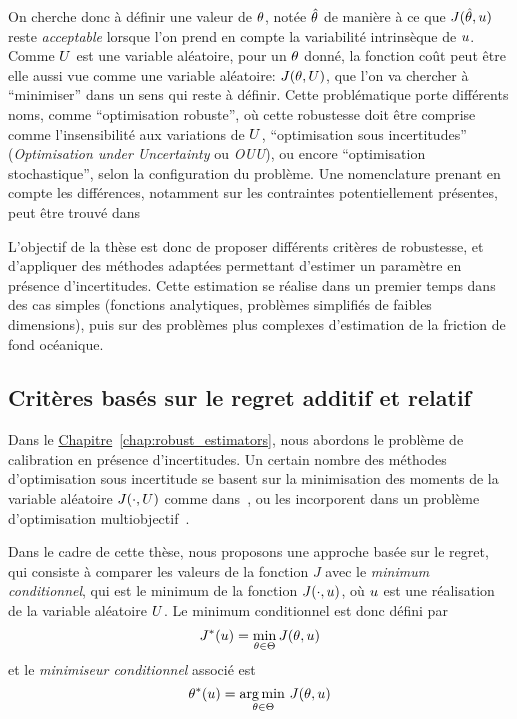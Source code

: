 \documentclass[../../Main_ManuscritThese.tex]{subfiles}
\newcommand{\frchap}[1]{\hyperref[#1]{Chapitre}~\ref{#1}}
\begin{document}
On cherche donc à définir une valeur de $\theta$, notée $\hat{\theta}$ de
manière à ce que $J(\hat{\theta}, u)$ reste \emph{acceptable} lorsque
l'on prend en compte la variabilité intrinsèque de $u$. Comme $U$
est une variable aléatoire, pour un $\theta$ donné, la fonction coût peut
être elle aussi vue comme une variable aléatoire: $J(\theta,U)$, que
l'on va chercher à ``minimiser'' dans un sens qui reste à définir.
Cette problématique porte différents noms, comme ``optimisation
robuste'', où cette robustesse doit être comprise comme
l'insensibilité aux variations de $U$, ``optimisation sous
incertitudes'' (\emph{Optimisation under Uncertainty} ou \emph{OUU}),
ou encore ``optimisation stochastique'', selon la configuration du
problème. Une nomenclature prenant en compte les différences,
notamment sur les contraintes potentiellement présentes, peut être
trouvé dans~\cite{lelievre_consideration_2016}


L'objectif de la thèse est donc de proposer différents critères de
robustesse, et d'appliquer des méthodes adaptées permettant d'estimer
un paramètre en présence d'incertitudes. Cette estimation se réalise
dans un premier temps dans des cas simples (fonctions analytiques,
problèmes simplifiés de faibles dimensions), puis sur des problèmes
plus complexes d'estimation de la friction de fond océanique.

\subsection*{Critères basés sur le regret additif et relatif}
Dans le \frchap{chap:robust_estimators}, nous abordons le problème de
calibration en présence d'incertitudes. Un certain nombre des méthodes
d'optimisation sous incertitude se basent sur la minimisation des
moments de la variable aléatoire $J(\mathbf{\cdot}, U)$ comme
dans~\cite{lehman_designing_2004,janusevskis_simultaneous_2010}, ou
les incorporent dans un problème d'optimisation
multiobjectif~\cite{baudoui_optimisation_2012,ribaud_krigeage_2018}.

Dans le cadre de cette thèse, nous proposons une approche basée sur le
regret, qui consiste à comparer les valeurs de la fonction $J$ avec le
\emph{minimum conditionnel}, qui est le minimum de la fonction
$J(\cdot, u)$, où $u$ est une réalisation de la variable aléatoire
$U$. Le minimum conditionnel est donc défini par
\begin{equation*}
  \label{eq:Jstar}
  J^*(u) = \min_{\theta\in\Theta} J(\theta,u)
\end{equation*}
et le \emph{minimiseur conditionnel} associé est
\begin{equation*}
  \label{eq:Kstar}
  \theta^*(u) = \operatorname*{arg\,min \,}_{\theta\in \Theta}J(\theta,u)
\end{equation*}
\end{document}
